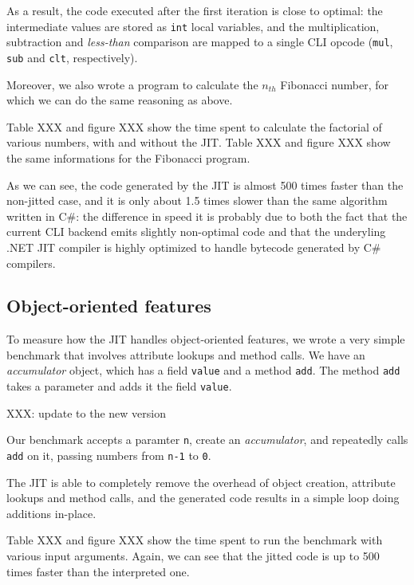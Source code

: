 As a result, the code executed after the first iteration is close to optimal:
the intermediate values are stored as \lstinline{int} local variables, and the
multiplication, subtraction and \emph{less-than} comparison are mapped to a
single CLI opcode (\lstinline{mul}, \lstinline{sub} and \lstinline{clt},
respectively).

Moreover, we also wrote a program to calculate the $n_{th}$ Fibonacci number,
for which we can do the same reasoning as above.

Table XXX and figure XXX show the time spent to calculate the factorial of
various numbers, with and without the JIT.  Table XXX and figure XXX show the
same informations for the Fibonacci program.


As we can see, the code generated by the JIT is almost 500 times faster than
the non-jitted case, and it is only about 1.5 times slower than the same
algorithm written in C\#: the difference in speed it is probably due to both
the fact that the current CLI backend emits slightly non-optimal code and that
the underyling .NET JIT compiler is highly optimized to handle bytecode
generated by C\# compilers.

\subsection{Object-oriented features}

To measure how the JIT handles object-oriented features, we wrote a very
simple benchmark that involves attribute lookups and method calls.  We have an
\emph{accumulator} object, which has a field \lstinline{value} and a method
\lstinline{add}.  The method \lstinline{add} takes a parameter and adds it the
field \lstinline{value}.

XXX: update to the new version

Our benchmark accepts a paramter \lstinline{n}, create an \emph{accumulator},
and repeatedly calls \lstinline{add} on it, passing numbers from
\lstinline{n-1} to \lstinline{0}.

The JIT is able to completely remove the overhead of object creation,
attribute lookups and method calls, and the generated code results in a simple
loop doing additions in-place.

Table XXX and figure XXX show the time spent to run the benchmark with various
input arguments. Again, we can see that the jitted code is up to 500 times
faster than the interpreted one.
